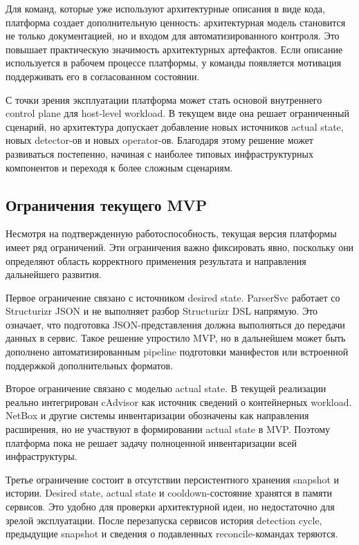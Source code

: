 Для команд, которые уже используют архитектурные описания в виде кода, платформа создает дополнительную ценность: архитектурная модель становится не только документацией, но и входом для автоматизированного контроля. Это повышает практическую значимость архитектурных артефактов. Если описание используется в рабочем процессе платформы, у команды появляется мотивация поддерживать его в согласованном состоянии.

С точки зрения эксплуатации платформа может стать основой внутреннего control plane для host-level workload. В текущем виде она решает ограниченный сценарий, но архитектура допускает добавление новых источников actual state, новых detector-ов и новых operator-ов. Благодаря этому решение может развиваться постепенно, начиная с наиболее типовых инфраструктурных компонентов и переходя к более сложным сценариям.

\subsection{Ограничения текущего MVP}

Несмотря на подтвержденную работоспособность, текущая версия платформы имеет ряд ограничений. Эти ограничения важно фиксировать явно, поскольку они определяют область корректного применения результата и направления дальнейшего развития.

Первое ограничение связано с источником desired state. ParserSvc работает со Structurizr JSON и не выполняет разбор Structurizr DSL напрямую. Это означает, что подготовка JSON-представления должна выполняться до передачи данных в сервис. Такое решение упростило MVP, но в дальнейшем может быть дополнено автоматизированным pipeline подготовки манифестов или встроенной поддержкой дополнительных форматов.

Второе ограничение связано с моделью actual state. В текущей реализации реально интегрирован cAdvisor как источник сведений о контейнерных workload. NetBox и другие системы инвентаризации обозначены как направления расширения, но не участвуют в формировании actual state в MVP. Поэтому платформа пока не решает задачу полноценной инвентаризации всей инфраструктуры.

Третье ограничение состоит в отсутствии персистентного хранения snapshot и истории. Desired state, actual state и cooldown-состояние хранятся в памяти сервисов. Это удобно для проверки архитектурной идеи, но недостаточно для зрелой эксплуатации. После перезапуска сервисов история detection cycle, предыдущие snapshot и сведения о подавленных reconcile-командах теряются.

